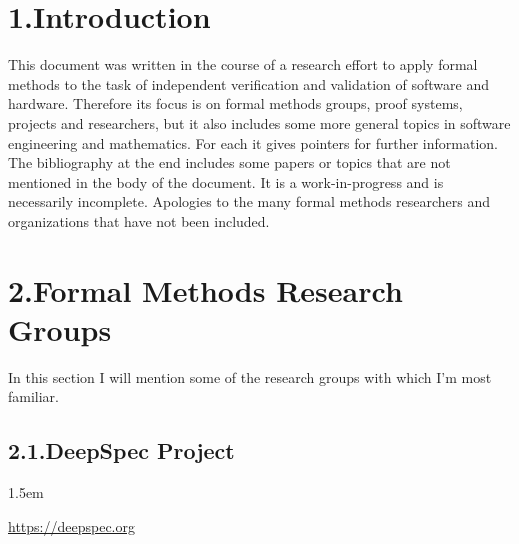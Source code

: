 \documentclass[12pt,twoside]{article}
\begin{document}
\section{1.\hspace*{0.5em}Introduction}%

\noindent{}This document was written in the course of a research effort to apply
formal methods to the task of independent verification and validation of
software and hardware. Therefore its focus is on formal methods groups,
proof systems, projects and researchers, but it also includes some more
general topics in software engineering and mathematics. For each it gives
pointers for further information. The bibliography at the end includes
some papers or topics that are not mentioned in the body of the document.
It is a work-in-progress and is necessarily incomplete. Apologies to the
many formal methods researchers and organizations that have not been
included.%

\section{2.\hspace*{0.5em}Formal Methods Research Groups}%

\noindent{}In this section I will mention some of the research groups with which I'm most familiar.%

\subsection{2.1.\hspace*{0.5em}DeepSpec Project}%

\begin{mddefinitions}%


\begin{mdbmarginx}{}{}{}{1.5em}%
\begin{mddefdata}%
\href{https://deepspec.org}{{\ttfamily https://\hspace{0pt}deepspec.\hspace{0pt}org}}%
\end{mddefdata}%
\end{mdbmarginx}%
\end{mddefinitions}%
\end{document}
